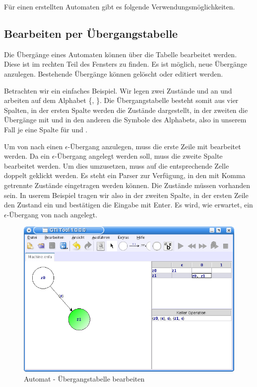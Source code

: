 Für einen erstellten Automaten gibt es folgende
Ver\-wen\-dungs\-möglich\-keiten.


\subsection{Bearbeiten per Übergangstabelle}

Die Übergänge eines Automaten können über die Tabelle bearbeitet werden. Diese
ist im rechten Teil des Fensters zu finden. Es ist möglich, neue Übergänge
anzulegen. Bestehende Übergänge können gelöscht oder editiert werden.\vspace{10pt}

Betrachten wir ein einfaches Beispiel. Wir legen zwei Zustände  und
 an und arbeiten auf dem Alphabet \{, \}. Die
Übergangstabelle besteht somit aus vier Spalten, in der ersten Spalte werden die
Zustände dargestellt, in der zweiten die Übergänge mit \Symbol{$\epsilon$} und in
den anderen die Symbole des Alphabets, also in unserem Fall je eine Spalte für
 und .\vspace{10pt}

Um von  nach  einen $\epsilon$-Übergang anzulegen, muss die
erste Zeile mit  bearbeitet werden. Da ein $\epsilon$-Übergang angelegt
werden soll, muss die zweite Spalte bearbeitet werden. Um dies umzusetzen, muss
auf die entsprechende Zelle doppelt geklickt werden. Es steht ein Parser zur
Verfügung, in den mit Komma getrennte Zustände eingetragen werden können. Die
Zustände müssen vorhanden sein. In userem Beispiel tragen wir also in der zweiten
Spalte, in der ersten Zeile den Zustand  ein und bestätigen die Eingabe
mit Enter. Es wird, wie erwartet, ein $\epsilon$-Übergang von  nach
 angelegt.\vspace{10pt}

\begin{figure}[h]
\begin{center}
\includegraphics[width=12cm]{../images/machine_table.png}
\caption{Automat - Übergangstabelle bearbeiten}
\end{center}
\end{figure}

